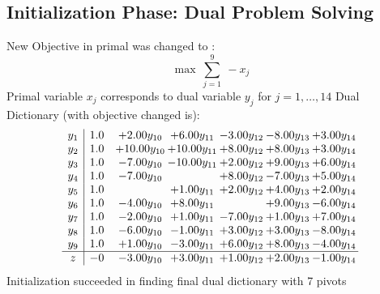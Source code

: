 \documentclass[9pt]{article}
\begin{document}
\subsection{Initialization Phase: Dual Problem Solving}
New Objective in primal was changed to : \[ \max\ \sum_{j=1}^{9}\ - x_j \] 
Primal variable $x_j$ corresponds to dual variable $y_j$ for $j = 1,\ldots,14$
Dual Dictionary (with objective changed is): 
\[\begin{array}{c| c c@{\hskip 2pt} c@{\hskip 2pt} c@{\hskip 2pt} c@{\hskip 2pt} c@{\hskip 2pt} }
 y_{1}   &  1.0 & +  2.00 y_{10} & +  6.00 y_{11} & -3.00 y_{12} & -8.00 y_{13} & +  3.00 y_{14}\\
 y_{2}   &  1.0 & + 10.00 y_{10} & + 10.00 y_{11} & +  8.00 y_{12} & +  8.00 y_{13} & +  3.00 y_{14}\\
 y_{3}   &  1.0 & -7.00 y_{10} & -10.00 y_{11} & +  2.00 y_{12} & +  9.00 y_{13} & +  6.00 y_{14}\\
 y_{4}   &  1.0 & -7.00 y_{10} &   & +  8.00 y_{12} & -7.00 y_{13} & +  5.00 y_{14}\\
 y_{5}   &  1.0  &   & +  1.00 y_{11} & +  2.00 y_{12} & +  4.00 y_{13} & +  2.00 y_{14}\\
 y_{6}   &  1.0 & -4.00 y_{10} & +  8.00 y_{11} &   & +  9.00 y_{13} & -6.00 y_{14}\\
 y_{7}   &  1.0 & -2.00 y_{10} & +  1.00 y_{11} & -7.00 y_{12} & +  1.00 y_{13} & +  7.00 y_{14}\\
 y_{8}   &  1.0 & -6.00 y_{10} & -1.00 y_{11} & +  3.00 y_{12} & +  3.00 y_{13} & -8.00 y_{14}\\
 y_{9}   &  1.0 & +  1.00 y_{10} & -3.00 y_{11} & +  6.00 y_{12} & +  8.00 y_{13} & -4.00 y_{14}\\
\hline
z    &  -0 & -3.00 y_{10} & +  3.00 y_{11} & +  1.00 y_{12} & +  2.00 y_{13} & -1.00 y_{14}\\
\end{array}\]
Initialization succeeded in finding final dual dictionary with 7 pivots
\end{document}

